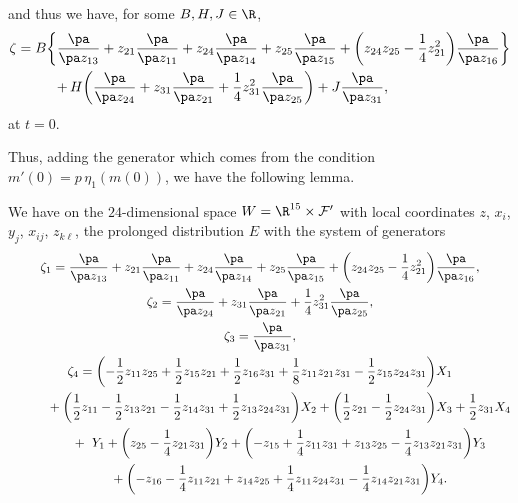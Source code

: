 and thus we have, for some $B, H, J \in \R$,
\begin{align*}
\zeta = B\biggl\{&{} \frac{\pa}{\pa z_{13}} + z_{21}\frac{\pa}{\pa z_{11}} + z_{24}\frac{\pa}{\pa z_{14}} +
z_{25}\frac{\pa}{\pa z_{15}} + \biggl(z_{24}z_{25} - \frac{1}{4}z_{21}^2\biggr)\frac{\pa}{\pa z_{16}}\biggr\}
\vspace{0.3truecm}
\\
&{}
{+}\, H\biggl(\frac{\pa}{\pa z_{24}} + z_{31}\frac{\pa}{\pa z_{21}} + \frac{1}{4}z_{31}^2\frac{\pa}{\pa z_{25}}\biggr) +
J\frac{\pa}{\pa z_{31}},
\end{align*}
at $t = 0$.

Thus, adding the generator which comes from the condition $m'(0) = p\,\eta_1(m(0))$, we have the following lemma.

\begin{Lemma}
\label{Generators-of-E}
We have on the $24$-dimensional
space $W = \R^{15}\times {\mathcal F}'$ with local coordinates $z$, $x_i$, $y_j$, $x_{ij}$, $z_{k\ell}$,
the prolonged distribution $E$ with the system of generators
\begin{gather*}
\zeta_1 = \frac{\pa}{\pa z_{13}} + z_{21}\frac{\pa}{\pa z_{11}} + z_{24}\frac{\pa}{\pa z_{14}} +
z_{25}\frac{\pa}{\pa z_{15}} + \biggl(z_{24}z_{25} - \frac{1}{4}z_{21}^2\biggr)\frac{\pa}{\pa z_{16}},
\\
\zeta_2 = \frac{\pa}{\pa z_{24}} + z_{31}\frac{\pa}{\pa z_{21}} + \frac{1}{4}z_{31}^2\frac{\pa}{\pa z_{25}},
\\
\zeta_3 = \frac{\pa}{\pa z_{31}},
\\
\zeta_4 = \biggl(-\frac{1}{2}z_{11}z_{25} + \frac{1}{2}z_{15}z_{21} + \frac{1}{2}z_{16}z_{31}
+ \frac{1}{8}z_{11}z_{21}z_{31} - \frac{1}{2}z_{15}z_{24}z_{31}\biggr)X_1
\\
\hphantom{\zeta_4 = \biggl(}{}
 + \biggl(\frac{1}{2}z_{11} - \frac{1}{2}z_{13}z_{21} - \frac{1}{2}z_{14}z_{31} + \frac{1}{2}z_{13}z_{24}z_{31}\biggr)X_2
+ \biggl(\frac{1}{2}z_{21} - \frac{1}{2}z_{24}z_{31}\biggr)X_3 + \frac{1}{2}z_{31}X_4
\\
\hphantom{\zeta_4 = \biggl(}{}
 + \ Y_1 + \biggl(z_{25} - \frac{1}{4}z_{21}z_{31}\biggr)Y_2 +
\biggl(-z_{15} + \frac{1}{4}z_{11}z_{31} + z_{13}z_{25} - \frac{1}{4}z_{13}z_{21}z_{31}\biggr)Y_3
\\
\hphantom{\zeta_4 = \biggl(}{}
 + \biggl(-z_{16} - \frac{1}{4}z_{11}z_{21} + z_{14}z_{25} + \frac{1}{4}z_{11}z_{24}z_{31}
- \frac{1}{4}z_{14}z_{21}z_{31}\biggr)Y_4.
\end{gather*}
\end{Lemma}


